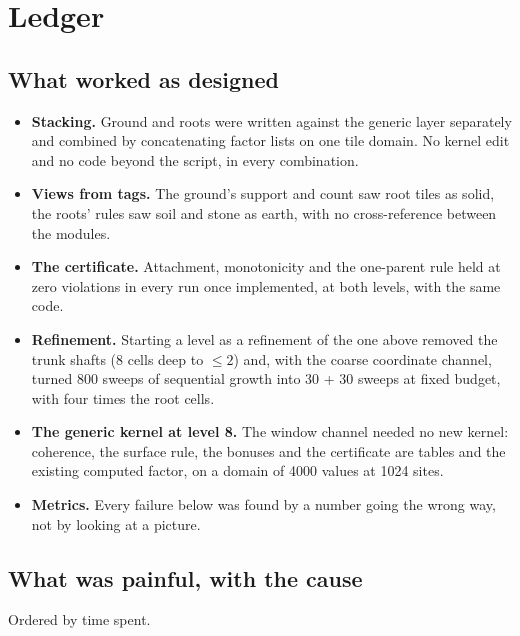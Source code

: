 \documentclass[11pt]{article}
\newcommand{\1}{\mathds{1}}
\begin{document}
\section{Ledger}
\label{sec:ledger}

\subsection{What worked as designed}

\begin{itemize}
\item \textbf{Stacking.} Ground and roots were written against the generic
  layer separately and combined by concatenating factor lists on one tile
  domain. No kernel edit and no code beyond the script, in every
  combination.
\item \textbf{Views from tags.} The ground's support and count saw root
  tiles as solid, the roots' rules saw soil and stone as earth, with no
  cross-reference between the modules.
\item \textbf{The certificate.} Attachment, monotonicity and the one-parent
  rule held at zero violations in every run once implemented, at both
  levels, with the same code.
\item \textbf{Refinement.} Starting a level as a refinement of the one above
  removed the trunk shafts (8 cells deep to $\le 2$) and, with the coarse
  coordinate channel, turned 800 sweeps of sequential growth into 30 + 30
  sweeps at fixed budget, with four times the root cells.
\item \textbf{The generic kernel at level 8.} The window channel needed no
  new kernel: coherence, the surface rule, the bonuses and the certificate
  are tables and the existing computed factor, on a domain of 4000 values
  at 1024 sites.
\item \textbf{Metrics.} Every failure below was found by a number going
  the wrong way, not by looking at a picture.
\end{itemize}

\subsection{What was painful, with the cause}

Ordered by time spent.
\end{document}
